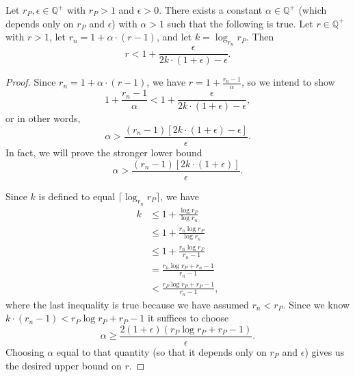 \documentclass[]{article}
\newcommand{\ceil}[1]{\lceil{#1}\rceil}
\begin{document}
\begin{lemma}\label{lem:alpha}
  Let $r_P, \epsilon \in \mathbb{Q}^+$ with $r_P > 1$ and $\epsilon > 0$.
  There exists a constant $\alpha \in \mathbb{Q}^+$ (which depends only on $r_P$ and $\epsilon$) with $\alpha > 1$ such that the following is true.
  Let $r \in \mathbb{Q}^+$ with $r > 1$, let $r_n = 1 + \alpha \cdot (r - 1)$, and let $k = \log_{r_n}{r_P}$.
  Then
  \begin{equation*}
    r < 1 + \frac{\epsilon}{2k \cdot (1 + \epsilon) - \epsilon}.
  \end{equation*}
\end{lemma}
\begin{proof}
  Since $r_n = 1 + \alpha \cdot (r - 1)$, we have $r = 1 + \frac{r_n - 1}{\alpha}$, so we intend to show
  \begin{equation*}
    1 + \frac{r_n - 1}{\alpha} < 1 + \frac{\epsilon}{2k \cdot (1 + \epsilon) - \epsilon},
  \end{equation*}
  or in other words,
  \begin{equation*}
    \alpha > \frac{(r_n - 1) \left[2k \cdot (1 + \epsilon) - \epsilon\right]}{\epsilon}.
  \end{equation*}
  In fact, we will prove the stronger lower bound
  \begin{equation*}
    \alpha > \frac{(r_n - 1)\left[2k \cdot (1 + \epsilon)\right]}{\epsilon}.
  \end{equation*}

  Since $k$ is defined to equal $\ceil{\log_{r_n}{r_P}}$, we have
  \begin{align*}
    k & \leq 1 + \frac{\log{r_P}}{\log{r_n}} \\
    & \leq 1 + \frac{r_n \log{r_P}}{\log{r_n}} \\
    & \leq 1 + \frac{r_n \log{r_P}}{r_n - 1} \\
    & = \frac{r_n \log{r_P} + r_n - 1}{r_n - 1} \\
    & < \frac{r_P \log{r_P} + r_P - 1}{r_n - 1},
  \end{align*}
  where the last inequality is true because we have assumed $r_n < r_P$.
  Since we know $k \cdot (r_n - 1) < r_P \log r_P + r_P - 1$ it suffices to choose
  \begin{equation*}
    \alpha \geq \frac{2(1 + \epsilon)(r_P \log r_P + r_P - 1)}{\epsilon}.
  \end{equation*}
  Choosing $\alpha$ equal to that quantity (so that it depends only on $r_P$ and $\epsilon$) gives us the desired upper bound on $r$.
\end{proof}
\end{document}
